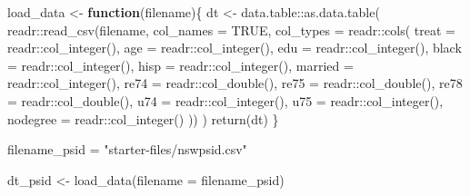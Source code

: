 \documentclass[
]{article}
\newenvironment{Shaded}{\begin{snugshade}}{\end{snugshade}}
\newcommand{\AttributeTok}[1]{\textcolor[rgb]{0.77,0.63,0.00}{#1}}
\newcommand{\ConstantTok}[1]{\textcolor[rgb]{0.00,0.00,0.00}{#1}}
\newcommand{\ControlFlowTok}[1]{\textcolor[rgb]{0.13,0.29,0.53}{\textbf{#1}}}
\newcommand{\FunctionTok}[1]{\textcolor[rgb]{0.00,0.00,0.00}{#1}}
\newcommand{\NormalTok}[1]{#1}
\newcommand{\OtherTok}[1]{\textcolor[rgb]{0.56,0.35,0.01}{#1}}
\newcommand{\SpecialCharTok}[1]{\textcolor[rgb]{0.00,0.00,0.00}{#1}}
\newcommand{\StringTok}[1]{\textcolor[rgb]{0.31,0.60,0.02}{#1}}
\begin{document}
\begin{Shaded}
\begin{Highlighting}[]
\NormalTok{load\_data }\OtherTok{\textless{}{-}} \ControlFlowTok{function}\NormalTok{(filename)\{}
\NormalTok{  dt }\OtherTok{\textless{}{-}}\NormalTok{ data.table}\SpecialCharTok{::}\FunctionTok{as.data.table}\NormalTok{(}
\NormalTok{    readr}\SpecialCharTok{::}\FunctionTok{read\_csv}\NormalTok{(filename,}
                     \AttributeTok{col\_names =} \ConstantTok{TRUE}\NormalTok{,}
                     \AttributeTok{col\_types =}\NormalTok{ readr}\SpecialCharTok{::}\FunctionTok{cols}\NormalTok{(}
                       \AttributeTok{treat =}\NormalTok{ readr}\SpecialCharTok{::}\FunctionTok{col\_integer}\NormalTok{(),}
                       \AttributeTok{age =}\NormalTok{ readr}\SpecialCharTok{::}\FunctionTok{col\_integer}\NormalTok{(),}
                       \AttributeTok{edu =}\NormalTok{ readr}\SpecialCharTok{::}\FunctionTok{col\_integer}\NormalTok{(),}
                       \AttributeTok{black =}\NormalTok{ readr}\SpecialCharTok{::}\FunctionTok{col\_integer}\NormalTok{(),}
                       \AttributeTok{hisp =}\NormalTok{ readr}\SpecialCharTok{::}\FunctionTok{col\_integer}\NormalTok{(),}
                       \AttributeTok{married =}\NormalTok{ readr}\SpecialCharTok{::}\FunctionTok{col\_integer}\NormalTok{(),}
                       \AttributeTok{re74 =}\NormalTok{ readr}\SpecialCharTok{::}\FunctionTok{col\_double}\NormalTok{(),}
                       \AttributeTok{re75 =}\NormalTok{ readr}\SpecialCharTok{::}\FunctionTok{col\_double}\NormalTok{(),}
                       \AttributeTok{re78 =}\NormalTok{ readr}\SpecialCharTok{::}\FunctionTok{col\_double}\NormalTok{(),}
                       \AttributeTok{u74 =}\NormalTok{ readr}\SpecialCharTok{::}\FunctionTok{col\_integer}\NormalTok{(),}
                       \AttributeTok{u75 =}\NormalTok{ readr}\SpecialCharTok{::}\FunctionTok{col\_integer}\NormalTok{(),}
                       \AttributeTok{nodegree =}\NormalTok{ readr}\SpecialCharTok{::}\FunctionTok{col\_integer}\NormalTok{()}
\NormalTok{                     ))}
\NormalTok{  )}
  \FunctionTok{return}\NormalTok{(dt)}
\NormalTok{\}}
\end{Highlighting}
\end{Shaded}

\begin{Shaded}
\begin{Highlighting}[]
\NormalTok{filename\_psid }\OtherTok{=} \StringTok{"starter{-}files/nswpsid.csv"}

\NormalTok{dt\_psid }\OtherTok{\textless{}{-}} \FunctionTok{load\_data}\NormalTok{(}\AttributeTok{filename =}\NormalTok{ filename\_psid)}
\end{Highlighting}
\end{Shaded}
\end{document}
